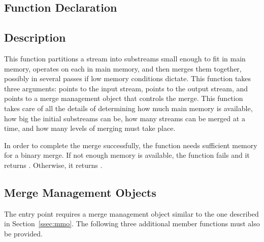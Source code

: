 \subsection{Function Declaration}
  \btabb
     {}
  \etabb

\subsection{Description}
This function partitions a stream into substreams small
enough to fit in main memory, operates on each in main memory, and then
merges them together, possibly in several passes if low memory conditions
dictate. This function takes three arguments:
 points to the input stream,
 points to the output stream, and
 points to a merge management object that controls the merge.
This function takes care of all the details of determining how much main
memory is available, how big the initial substreams can be, how many
streams can be merged at a time, and how many levels of merging must take
place.

In order to complete the merge successfully, the function needs sufficient
memory for a binary merge. If not enough memory is available, the function
fails and it returns
. Otherwise, it returns
.

\subsection{Merge Management Objects}
The  entry point requires
a merge management object similar to the one described in
Section~\ref{ssec:mmo}. The following three additional member functions
must also be provided.

